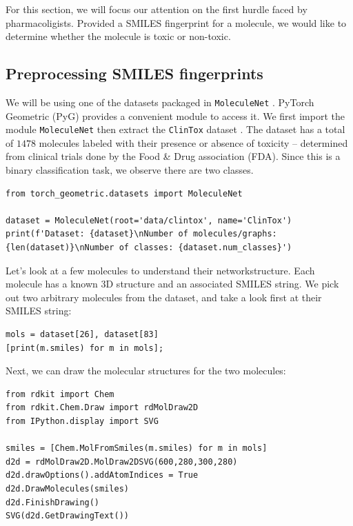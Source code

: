 For this section, we will focus our attention on the first hurdle faced by pharmacoligists. Provided a SMILES fingerprint for a molecule, we would like to determine whether the molecule is toxic or non-toxic.
\subsection{Preprocessing SMILES fingerprints}

We will be using one of the datasets packaged in \texttt{MoleculeNet} \cite{moleculenet}. PyTorch Geometric (PyG) \cite{pytorchgeom,pytorch} provides a convenient module to access it. We first import the module \texttt{MoleculeNet} then extract the \texttt{ClinTox} dataset \cite{Novick2013Nov}. The dataset has a total of $1478$ molecules labeled with their presence or absence of toxicity -- determined from clinical trials done by the Food & Drug association (FDA). Since this is a binary classification task, we observe there are two classes.

\begin{lstlisting}[style=python]
from torch_geometric.datasets import MoleculeNet

dataset = MoleculeNet(root='data/clintox', name='ClinTox')
print(f'Dataset: {dataset}\nNumber of molecules/graphs: {len(dataset)}\nNumber of classes: {dataset.num_classes}')
\end{lstlisting}

Let's look at a few molecules to understand their networkstructure. Each molecule has a known 3D structure and an associated SMILES string. We pick out two arbitrary molecules from the dataset, and take a look first at their SMILES string:

\begin{lstlisting}[style=python]
mols = dataset[26], dataset[83]
[print(m.smiles) for m in mols];
\end{lstlisting}

Next, we can draw the molecular structures for the two molecules:

\begin{lstlisting}[style=python]
from rdkit import Chem
from rdkit.Chem.Draw import rdMolDraw2D
from IPython.display import SVG

smiles = [Chem.MolFromSmiles(m.smiles) for m in mols]
d2d = rdMolDraw2D.MolDraw2DSVG(600,280,300,280)
d2d.drawOptions().addAtomIndices = True
d2d.DrawMolecules(smiles)
d2d.FinishDrawing()
SVG(d2d.GetDrawingText())
\end{lstlisting}

